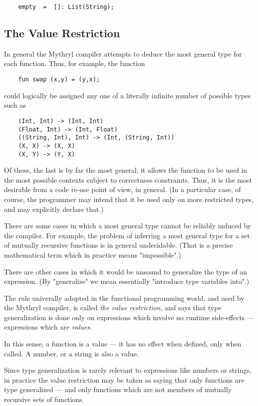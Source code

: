 \begin{verbatim}
    empty  =  []: List(String);
\end{verbatim}


\cutend*


\subsection{The Value Restriction}
\label{section:ref:types:the-value-restriction}

In general the Mythryl compiler attempts to deduce the most  
general type for each function.  Thus, for example, the function

\begin{verbatim}
    fun swap (x,y) = (y,x);
\end{verbatim}

could logically be assigned any one of a literally infinite 
number of possible types such as 

\begin{verbatim}
    (Int, Int) -> (Int, Int)
    (Float, Int) -> (Int, Float)
    ((String, Int), Int) -> (Int, (String, Int))
    (X, X) -> (X, X)
    (X, Y) -> (Y, X)
\end{verbatim}

Of these, the last is by far the most general;  it allows the 
function to be used in the most possible contexts subject to 
correctness constraints.  Thus, it is the most desirable from 
a code re-use point of view, in general.  (In a particular case, 
of course, the programmer may intend that it be used only on 
more restricted types, and may explicitly declare that.)

There are some cases in which a most general type cannot be 
reliably induced by the compiler.  For example, the problem 
of inferring a most general type for a set of mutually recursive 
functions is in general undecidable.  (That is a precise mathematical 
term which in practice means "impossible".)

There are other cases in which it would be unsound to generalize 
the type of an expression.  (By "generalize" we mean essentially 
"introduce type variables into".)

The rule univerally adopted in the functional programming world, 
and used by the Mythryl compiler, is called {\it the value restriction}, 
and says that type generalization is done only on expressions which 
involve no runtime side-effects --- expressions which are {\it values}.

In this sense, a function is a value --- it has no effect when defined, 
only when called.  A number, or a string is also a value.

Since type generalization is rarely relevant to expressions like numbers 
or strings, in practice the value restriction may be taken as saying that 
only functions are type generalized --- and only functions which are 
not members of mutually recursive sets of functions.

\cutend*



